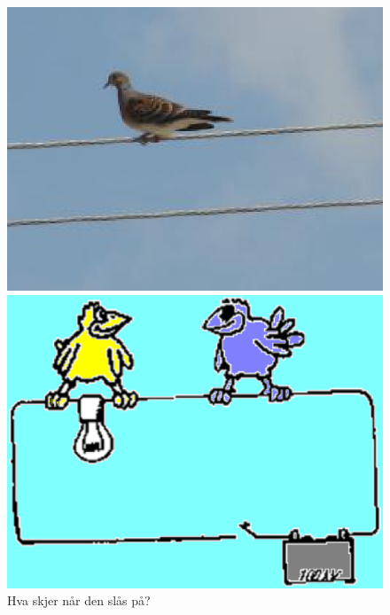 \documentclass[../Elmag-labhefte-2020.tex]{subfiles}
\begin{document}
\begin{figure}[!ht]
    \begin{minipage}[b]{0.49\linewidth}
        \centering
        \includegraphics[scale=0.82]{fig/BirdL.eps}
        \caption{%
            En fugl som sitter på en kraftlinje.
        }
        \label{fig:BirdA}
    \end{minipage}
    \hspace{0.1cm}
    \begin{minipage}[b]{0.49\linewidth}
        \centering
        \includegraphics[scale=0.35]{fig/BirdC.eps}
        \caption{%
            Hva skjer når den slås på?
        }
        \label{fig:BirdB}
    \end{minipage}
\end{figure}
\end{document}
